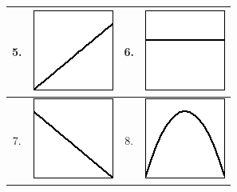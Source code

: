 \begin{enumerate}[1.]
\begin{multicols}{2}
\begin{Question}
\begin{center}
\begin{center}
\begin{tabular}{|c|c|c|c|}
 \\ \hline 
5. &\includegraphics[width=0.20\linewidth]{graphics/Week01_DerivativeDefinition/aableson-2062-setUnit_02_DerivativeDefinitionprob2image1}
 &6. &\includegraphics[width=0.20\linewidth]{graphics/Week01_DerivativeDefinition/aableson-2062-setUnit_02_DerivativeDefinitionprob2image2}
 \\ \hline 
 7. &\includegraphics[width=0.20\linewidth]{graphics/Week01_DerivativeDefinition/aableson-2062-setUnit_02_DerivativeDefinitionprob2image3}
 &8. &\includegraphics[width=0.20\linewidth]{graphics/Week01_DerivativeDefinition/aableson-2062-setUnit_02_DerivativeDefinitionprob2image8}
 \\ \hline 
\end {tabular}\end{center}\par\smallskip
\end{center} 
\par 
\par  \end{Question}
\begin{Solution}
 

\end{Solution}
\end{multicols}
\end{enumerate}
